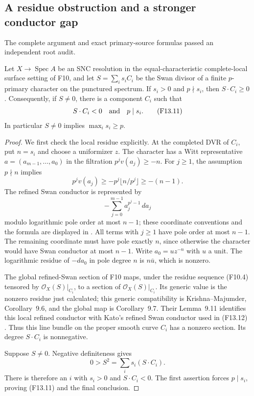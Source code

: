\subsection{A residue obstruction and a stronger conductor gap}

The complete argument and exact primary-source formulas passed an
independent root audit.

\begin{lemma}
Let $X\to\operatorname{Spec}A$ be an SNC resolution in the
equal-characteristic complete-local surface setting of F10, and
let $S=\sum_i s_iC_i$ be the Swan divisor of a finite
$p$-primary character on the punctured spectrum. If $s_i>0$
and $p\nmid s_i$, then $S\cdot C_i\geq0$. Consequently, if
$S\ne0$, there is a component $C_i$ such that
\[
                 S\cdot C_i<0\quad\hbox{and}\quad p\mid s_i.
 \tag{F13.11}
\]
In particular $S\ne0$ implies $\max_i s_i\geq p$.
\end{lemma}
\begin{proof}
We first check the local residue explicitly. At the completed
DVR of $C_i$, put $n=s_i$ and choose a uniformizer $z$.
The character has a Witt representative
$a=(a_{m-1},\ldots,a_0)$ in the filtration
$p^jv(a_j)\geq-n$. For $j\geq1$, the assumption $p\nmid n$
implies
\[
 p^jv(a_j)\geq-p^j\lfloor n/p^j\rfloor\geq-(n-1).
\]
The refined Swan conductor is represented by
\[
                  -\sum_{j=0}^{m-1}a_j^{p^j-1}\,da_j
 \tag{F13.12}
\]
modulo logarithmic pole order at most $n-1$; these coordinate
conventions and the formula are displayed in
\cite[Definition~2.1 and (2.5), pp.~8--9]{Yatagawa2017Cycle}.
All terms with $j\geq1$ have pole order at most $n-1$.
The remaining coordinate must have pole exactly $n$, since
otherwise the character would have Swan conductor at most
$n-1$. Write $a_0=uz^{-n}$ with $u$ a unit. The logarithmic
residue of $-da_0$ in pole degree $n$ is
$n\bar u$, which is nonzero.

The global refined-Swan section of F10 maps, under the residue
sequence (F10.4) tensored by $\mathcal O_X(S)|_{C_i}$, to a
section of $\mathcal O_X(S)|_{C_i}$. Its generic value is the
nonzero residue just calculated; this generic compatibility is
Krishna--Majumder, Corollary~9.6, and the global map is
Corollary~9.7. Their Lemma~9.11 identifies this local refined
conductor with Kato's refined Swan conductor used in (F13.12)
\cite[Corollaries~9.6--9.7, pp.~55--56, and Lemma~9.11,
p.~57]{KrishnaMajumder2026}.
Thus this line bundle on the proper smooth curve $C_i$ has a
nonzero section. Its degree $S\cdot C_i$ is nonnegative.

Suppose $S\ne0$. Negative definiteness gives
\[
                  0>S^2=\sum_i s_i(S\cdot C_i).
\]
There is therefore an $i$ with $s_i>0$ and $S\cdot C_i<0$.
The first assertion forces $p\mid s_i$, proving (F13.11) and
the final conclusion.
\end{proof}

